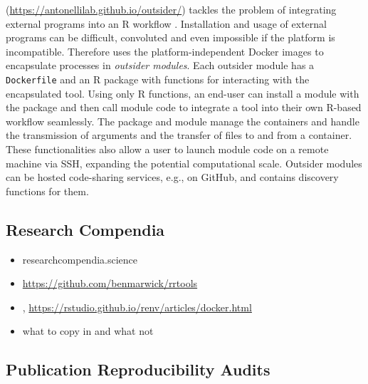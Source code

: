 \textbf{} (\url{https://antonellilab.github.io/outsider/})
tackles the problem of integrating external programs into an R workflow
\citep{bennett_outsider_2020}. Installation and usage of external
programs can be difficult, convoluted and even impossible if the
platform is incompatible. Therefore  uses the
platform-independent Docker images to encapsulate processes in
\emph{outsider modules}. Each outsider module has a \texttt{Dockerfile}
and an R package with functions for interacting with the encapsulated
tool. Using only R functions, an end-user can install a module with the
 package and then call module code to integrate a tool
into their own R-based workflow seamlessly. The  package
and module manage the containers and handle the transmission of
arguments and the transfer of files to and from a container. These
functionalities also allow a user to launch module code on a remote
machine via SSH, expanding the potential computational scale. Outsider
modules can be hosted code-sharing services, e.g., on GitHub, and
 contains discovery functions for them.

\hypertarget{research-compendia}{%
\subsection{Research Compendia}\label{research-compendia}}

\label{compendia}

\begin{itemize}
\tightlist
\item
  researchcompendia.science
\item
  \url{https://github.com/benmarwick/rrtools}
\item
  , \url{https://rstudio.github.io/renv/articles/docker.html}
\item
  what to copy in and what not
\end{itemize}

\hypertarget{publication-reproducibility-audits}{%
\subsection{Publication Reproducibility
Audits}\label{publication-reproducibility-audits}}

